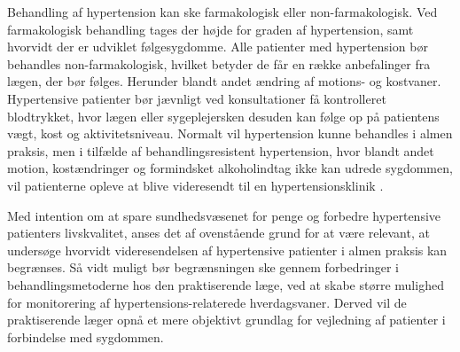 Behandling af hypertension kan ske farmakologisk eller non-farmakologisk. Ved farmakologisk behandling tages der højde for graden af hypertension, samt hvorvidt der er udviklet følgesygdomme. Alle patienter med hypertension bør behandles non-farmakologisk, hvilket betyder de får en række anbefalinger fra lægen, der bør følges. Herunder blandt andet ændring af motions- og kostvaner. Hypertensive patienter bør jævnligt ved konsultationer få kontrolleret blodtrykket, hvor lægen eller sygeplejersken desuden kan følge op på patientens vægt, kost og aktivitetsniveau. Normalt vil hypertension kunne behandles i almen praksis, men i tilfælde af behandlingsresistent hypertension, hvor blandt andet motion, kostændringer og formindsket alkoholindtag ikke kan udrede sygdommen, vil patienterne opleve at blive videresendt til en hypertensionsklinik \cite{lodberg2016, bech2015}.

Med intention om at spare sundhedsvæsenet for penge og forbedre hypertensive patienters livskvalitet, anses det af ovenstående grund for at være relevant, at undersøge hvorvidt videresendelsen af hypertensive patienter i almen praksis kan begrænses. Så vidt muligt bør begrænsningen ske gennem forbedringer i behandlingsmetoderne hos den praktiserende læge, ved at skabe større mulighed for monitorering af hypertensions-relaterede hverdagsvaner. Derved vil de praktiserende læger opnå et mere objektivt grundlag for vejledning af patienter i forbindelse med sygdommen.